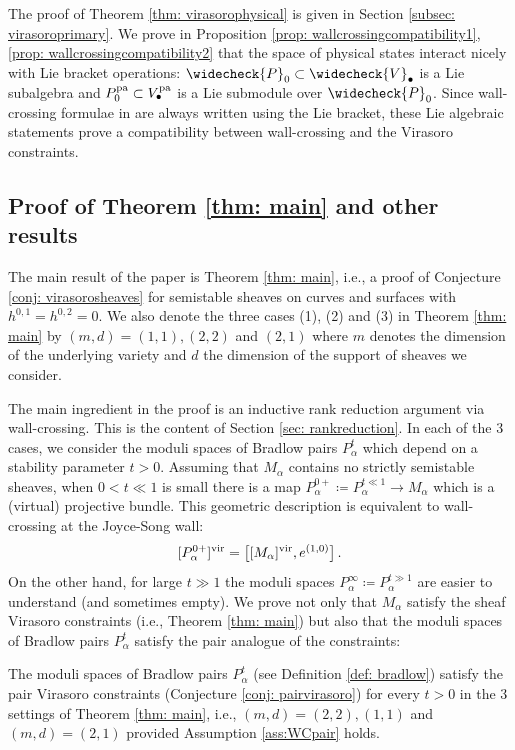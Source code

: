 \documentclass[a4paper, 12pt]{amsart}
\begin{document}
The proof of Theorem \ref{thm: virasorophysical} is given in Section \ref{subsec: virasoroprimary}. We prove in Proposition \ref{prop: wallcrossingcompatibility1}, \ref{prop: wallcrossingcompatibility2} that the space of physical states interact nicely with Lie bracket operations: $\widecheck{P}_0\subset \widecheck{V}_\bullet
$ is a Lie subalgebra and $P_0^{\mathop{\rm pa}\nolimits} \subset V_\bullet^{\mathop{\rm pa}\nolimits}$ is a Lie submodule over $\widecheck{P}_0$. Since wall-crossing formulae in \cite{Jo21} are always written using the Lie bracket, these Lie algebraic statements prove a compatibility between wall-crossing and the Virasoro constraints. 


\subsection{Proof of Theorem \ref{thm: main} and other results}
\label{sec: results}

The main result of the paper is Theorem \ref{thm: main}, i.e., a proof of Conjecture \ref{conj: virasorosheaves} for semistable sheaves on curves and surfaces with $h^{0,1}=h^{0,2}=0$. We also denote the three cases (1), (2)  and (3) in Theorem \ref{thm: main} by $(m,d) = (1,1), (2,2)$ and $(2,1)$ where $m$ denotes the dimension of the underlying variety and $d$ the dimension of the support of sheaves we consider. 

The main ingredient in the proof is an inductive rank reduction argument via wall-crossing. This is the content of Section \ref{sec: rankreduction}. In each of the 3 cases, we consider the moduli spaces of Bradlow pairs $P^t_\alpha$ which depend on a stability parameter $t>0$. Assuming that $M_\alpha$ contains no strictly semistable sheaves, when $0<t\ll 1$ is small there is a map $P^{0+}_\alpha\coloneqq  P^{t\ll 1}_\alpha\to M_\alpha$ which is a (virtual) projective bundle. This geometric description is equivalent to wall-crossing at the Joyce-Song wall:
$$[P^{0+}_{\alpha}]^{\mathrm{vir}} = \big[[M_{\alpha}]^{\mathrm{vir}},e^{(1,0)}\big]\,.$$
On the other hand, for large $t\gg 1$ the moduli spaces $P^{\infty}_\alpha\coloneqq  P^{t\gg 1}_\alpha$ are easier to understand (and sometimes empty). We prove not only that $M_\alpha$ satisfy the sheaf Virasoro constraints (i.e., Theorem  \ref{thm: main}) but also that the moduli spaces of Bradlow pairs $P_\alpha^t$ satisfy the pair analogue of the constraints:
\begin{theorem}\label{thm: virasorobradlowpairs}
The moduli spaces of Bradlow pairs $P_\alpha^t$ (see Definition \ref{def: bradlow}) satisfy the pair Virasoro constraints (Conjecture \ref{conj: pairvirasoro}) for every $t>0$ in the 3 settings of Theorem \ref{thm: main}, i.e., $(m,d)=(2,2), (1,1)$ and $(m,d)=(2,1)$ provided Assumption \ref{ass:WCpair} holds.
\end{theorem}
\end{document}
